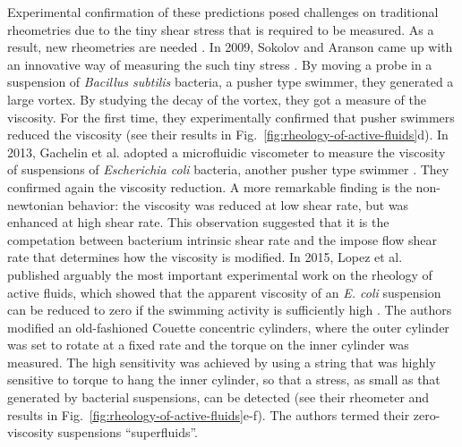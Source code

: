 Experimental confirmation of these predictions posed challenges on traditional rheometries due to the tiny shear stress that is required to be measured. As a result, new rheometries are needed \cite{Marchetti2015}. In 2009, Sokolov and Aranson came up with an innovative way of measuring the such tiny stress \cite{Sokolov2009}. By moving a probe in a suspension of \textit{Bacillus subtilis} bacteria, a pusher type swimmer, they generated a large vortex. By studying the decay of the vortex, they got a measure of the viscosity. For the first time, they experimentally confirmed that pusher swimmers reduced the viscosity (see their results in Fig.~\ref{fig:rheology-of-active-fluids}d). In 2013, Gachelin et al. adopted a microfluidic viscometer to measure the viscosity of suspensions of \textit{Escherichia coli} bacteria, another pusher type swimmer \cite{Gachelin2013}. They confirmed again the viscosity reduction. A more remarkable finding is the non-newtonian behavior: the viscosity was reduced at low shear rate, but was enhanced at high shear rate. This observation suggested that it is the competation between bacterium intrinsic shear rate and the impose flow shear rate that determines how the viscosity is modified. In 2015, Lopez et al. published arguably the most important experimental work on the rheology of active fluids, which showed that the apparent viscosity of an \textit{E. coli} suspension can be reduced to zero if the swimming activity is sufficiently high \cite{Lopez2015}. The authors modified an old-fashioned Couette concentric cylinders, where the outer cylinder was set to rotate at a fixed rate and the torque on the inner cylinder was measured. The high sensitivity was achieved by using a string that was highly sensitive to torque to hang the inner cylinder, so that a stress, as small as that generated by bacterial suspensions, can be detected (see their rheometer and results in Fig.~\ref{fig:rheology-of-active-fluids}e-f). The authors termed their zero-viscosity suspensions ``superfluids''.

